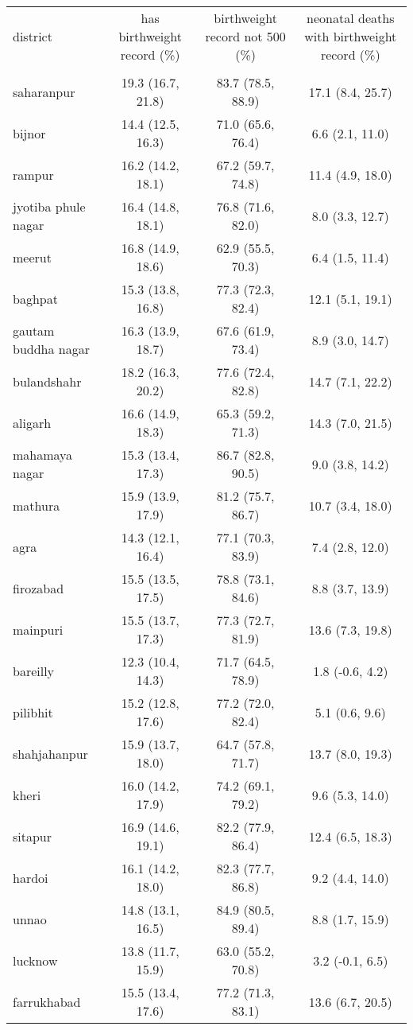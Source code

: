 \begin{tabular}{lccc}
\toprule
district & has birthweight record (\%) & birthweight record not 500 (\%) & neonatal deaths with birthweight record (\%) \\\\
\midrule
saharanpur&19.3 (16.7, 21.8)&83.7 (78.5, 88.9)&17.1 (8.4, 25.7)\\
bijnor&14.4 (12.5, 16.3)&71.0 (65.6, 76.4)&6.6 (2.1, 11.0)\\
rampur&16.2 (14.2, 18.1)&67.2 (59.7, 74.8)&11.4 (4.9, 18.0)\\
jyotiba phule nagar&16.4 (14.8, 18.1)&76.8 (71.6, 82.0)&8.0 (3.3, 12.7)\\
meerut&16.8 (14.9, 18.6)&62.9 (55.5, 70.3)&6.4 (1.5, 11.4)\\
baghpat&15.3 (13.8, 16.8)&77.3 (72.3, 82.4)&12.1 (5.1, 19.1)\\
gautam buddha nagar&16.3 (13.9, 18.7)&67.6 (61.9, 73.4)&8.9 (3.0, 14.7)\\
bulandshahr&18.2 (16.3, 20.2)&77.6 (72.4, 82.8)&14.7 (7.1, 22.2)\\
aligarh&16.6 (14.9, 18.3)&65.3 (59.2, 71.3)&14.3 (7.0, 21.5)\\
mahamaya nagar&15.3 (13.4, 17.3)&86.7 (82.8, 90.5)&9.0 (3.8, 14.2)\\
mathura&15.9 (13.9, 17.9)&81.2 (75.7, 86.7)&10.7 (3.4, 18.0)\\
agra&14.3 (12.1, 16.4)&77.1 (70.3, 83.9)&7.4 (2.8, 12.0)\\
firozabad&15.5 (13.5, 17.5)&78.8 (73.1, 84.6)&8.8 (3.7, 13.9)\\
mainpuri&15.5 (13.7, 17.3)&77.3 (72.7, 81.9)&13.6 (7.3, 19.8)\\
bareilly&12.3 (10.4, 14.3)&71.7 (64.5, 78.9)&1.8 (-0.6, 4.2)\\
pilibhit&15.2 (12.8, 17.6)&77.2 (72.0, 82.4)&5.1 (0.6, 9.6)\\
shahjahanpur&15.9 (13.7, 18.0)&64.7 (57.8, 71.7)&13.7 (8.0, 19.3)\\
kheri&16.0 (14.2, 17.9)&74.2 (69.1, 79.2)&9.6 (5.3, 14.0)\\
sitapur&16.9 (14.6, 19.1)&82.2 (77.9, 86.4)&12.4 (6.5, 18.3)\\
hardoi&16.1 (14.2, 18.0)&82.3 (77.7, 86.8)&9.2 (4.4, 14.0)\\
unnao&14.8 (13.1, 16.5)&84.9 (80.5, 89.4)&8.8 (1.7, 15.9)\\
lucknow&13.8 (11.7, 15.9)&63.0 (55.2, 70.8)&3.2 (-0.1, 6.5)\\
farrukhabad&15.5 (13.4, 17.6)&77.2 (71.3, 83.1)&13.6 (6.7, 20.5)\\

\end{tabular}
